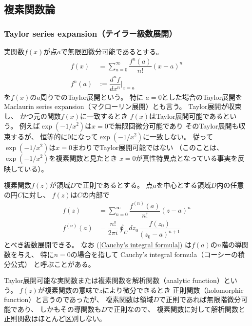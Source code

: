 \newpage
\subsection{複素関数論}

\subsubsection{Taylor series expansion（テイラー級数展開）}

実関数$f(x)$が点$a$で無限回微分可能であるとする。
\begin{subequations}
\begin{align}
    f(x)
    &=
    \sum_{n=0}^{\infty}
    \dfrac{ f^{n}(a) }{n!}
    (x-a)^n
\label{Taylor series expansion}
\\
    f^{n}(a)
    &:=
    \dfrac{d^nf}{dx^n}\bigg|_{x=a}
\end{align}
\end{subequations}
を$f(x)$の$a$周りでのTaylor展開という。
特に
$a=0$とした場合のTaylor展開を
Maclaurin series expansion（マクローリン展開）とも言う。
Taylor展開が収束し、
かつ元の関数$f(x)$に一致するとき
$f(x)$はTaylor展開可能であるという。
例えば$\exp(-1/x^2)$は$x=0$で無限回微分可能であり
そのTaylor展開も収束するが、
恒等的に$0$になって$\exp(-1/x^2)$に一致しない。
従って$\exp(-1/x^2)$は$x=0$まわりでTaylor展開可能ではない
（このことは、$\exp(-1/x^2)$を複素関数と見たとき
$x=0$が真性特異点となっている事実を反映している）。

複素関数$f(z)$が領域$D$で正則であるとする。
点$a$を中心とする領域$D$内の任意の円$C$に対し、
$f(z)$は$C$の内部で
\begin{subequations}
\begin{align}
    f(z)
    &=
    \sum_{n=0}^{\infty}
    \dfrac{f^{(n)}(a)}{n!}
    (z-a)^n
\\
    f^{(n)}(a)
    &=
    \dfrac{n!}{2 \pi i}
    \oint_C dz_0\dfrac{f(z_0)}{(z_0 - a)^{n+1}}
\label{Cauchy's integral formula}
\end{align}
\end{subequations}
とべき級数展開できる。
なお
(\ref{Cauchy's integral formula})
は$f(a)$の$n$階の導関数を与え、
特に$n=0$の場合を指して
Cauchy's integral formula（コーシーの積分公式）
と呼ぶことがある。

Taylor展開可能な実関数または複素関数を解析関数（analytic function）という。
$f(z)$が複素関数の意味で$z$により微分できるとき
正則関数（holomorphic function）と言うのであったが、
複素関数は領域$D$で正則であれば無限階微分可能であり、
しかもその導関数も$D$で正則なので、
複素関数に対して解析関数と正則関数はほとんど区別しない。

